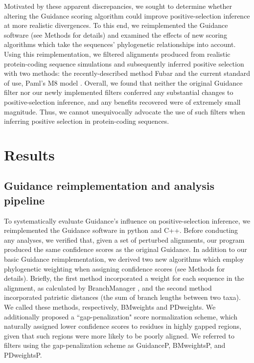 \documentclass[10pt]{article}
\begin{document}
Motivated by these apparent discrepancies, we sought to determine whether altering the Guidance scoring algorithm could improve positive-selection inference at more realistic divergences. To this end, we reimplemented the Guidance software (see Methods for details) and examined the effects of new scoring algorithms which take the sequences' phylogenetic relationships into account. Using this reimplementation, we filtered alignments produced from realistic protein-coding sequence simulations and subsequently inferred positive selection with two methods: the recently-described method Fubar \citep{Murrell2013} and the current standard of use, Paml's M8 model \citep{Yang2007}. Overall, we found that neither the original Guidance filter nor our newly implemented filters conferred any substantial changes to positive-selection inference, and any benefits recovered were of extremely small magnitude. Thus, we cannot unequivocally advocate the use of such filters when inferring positive selection in protein-coding sequences.


\section*{Results}

\subsection*{Guidance reimplementation and analysis pipeline}
To systematically evaluate Guidance's influence on positive-selection inference, we reimplemented the Guidance software in python and C++. Before conducting any analyses, we verified that, given a set of perturbed alignments, our program produced the same confidence scores as the original Guidance. In addition to our basic Guidance reimplementation, we derived two new algorithms which employ phylogenetic weighting when assigning confidence scores (see Methods for details).  Briefly, the first method incorporated a weight for each sequence in the alignment, as calculated by BranchManager \citep{Stone2007}, and the second method incorporated patristic distances (the sum of branch lengths between two taxa). We called these methods, respectively, BMweights and PDweights.  We additionally proposed a ``gap-penalization" score normalization scheme, which naturally assigned lower confidence scores to residues in highly gapped regions, given that such regions were more likely to be poorly aligned. We referred to filters using the gap-penalization scheme as GuidanceP, BMweightsP, and PDweightsP.
\end{document}
